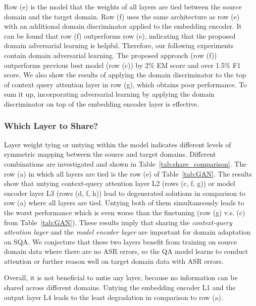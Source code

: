 \documentclass{article}
\begin{document}
Row (e) is the model that the weights of all layers are tied between the source domain and the target domain. 
Row (f) uses the same architecture as row (e) with an additional domain discriminator applied to the embedding encoder.
It can be found that row (f) outperforms row (e), indicating that the proposed domain adversarial learning is helpful. Therefore, our following experiments contain domain adversarial learning. 
The proposed approach (row (f)) outperforms previous best model (row (c)) by 2\% EM score and over 1.5\% F1 score.
We also show the results of applying the domain discriminator to the top of context query attention layer in row (g), which obtains poor performance.
To sum it up, incorporating adversarial learning by applying the domain discriminator on top of the embedding encoder layer is effective. 





\subsubsection{Which Layer to Share?}
Layer weight tying or untying within the model indicates different levels of symmetric mapping between the source and target domains.
Different combinations are investigated and shown in Table~\ref{tab:share_comparison}. 
The row (a)  in which all layers are tied is the row (e) of Table~\ref{tab:GAN}. 
The results show that untying context-query attention layer L2 (rows (c, f, g)) or model encoder layer L3 (rows (d, f, h)) lead to degenerated solutions in comparison to row (a) where all layers are tied. 
Untying both of them simultaneously leads to the worst performance which is even worse than the finetuning (row (g) v.s. (c) from Table~\ref{tab:GAN}). 
These results imply that sharing the \emph{context-query attention layer} and the \emph{model encoder layer} are important for domain adaptation on SQA. 
We conjecture that these two layers benefit from training on source domain data where there are no ASR errors, so the QA model learns to conduct attention or further reason well on target domain data with ASR errors.

Overall, it is not beneficial to untie any layer, because no information can be shared across different domains.
Untying the embedding encoder L1 and the output layer L4 leads to the least degradation in comparison to row (a). 
\end{document}
